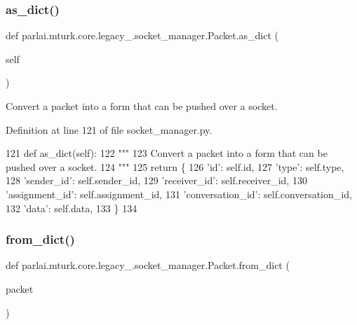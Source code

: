 \subsubsection{\texorpdfstring{as\+\_\+dict()}{as\_dict()}}
{\footnotesize\ttfamily def parlai.\+mturk.\+core.\+legacy\+\_.\+socket\+\_\+manager.\+Packet.\+as\+\_\+dict (\begin{DoxyParamCaption}\item[{}]{self }\end{DoxyParamCaption})}

\begin{DoxyVerb}Convert a packet into a form that can be pushed over a socket.
\end{DoxyVerb}
 

Definition at line 121 of file socket\+\_\+manager.\+py.


\begin{DoxyCode}
121     \textcolor{keyword}{def }as\_dict(self):
122         \textcolor{stringliteral}{"""}
123 \textcolor{stringliteral}{        Convert a packet into a form that can be pushed over a socket.}
124 \textcolor{stringliteral}{        """}
125         \textcolor{keywordflow}{return} \{
126             \textcolor{stringliteral}{'id'}: self.id,
127             \textcolor{stringliteral}{'type'}: self.type,
128             \textcolor{stringliteral}{'sender\_id'}: self.sender\_id,
129             \textcolor{stringliteral}{'receiver\_id'}: self.receiver\_id,
130             \textcolor{stringliteral}{'assignment\_id'}: self.assignment\_id,
131             \textcolor{stringliteral}{'conversation\_id'}: self.conversation\_id,
132             \textcolor{stringliteral}{'data'}: self.data,
133         \}
134 
\end{DoxyCode}
\mbox{\label{classparlai_1_1mturk_1_1core_1_1legacy__2018_1_1socket__manager_1_1Packet_a4ff11eed0eea4dcf2454533758f88a85}} 
\subsubsection{\texorpdfstring{from\+\_\+dict()}{from\_dict()}}
{\footnotesize\ttfamily def parlai.\+mturk.\+core.\+legacy\+\_.\+socket\+\_\+manager.\+Packet.\+from\+\_\+dict (\begin{DoxyParamCaption}\item[{}]{packet }\end{DoxyParamCaption})\hspace{0.3cm}{\ttfamily [static]}}

